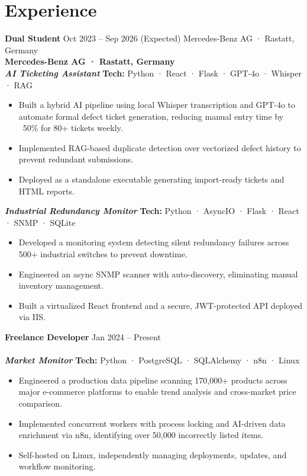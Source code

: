 \documentclass[10pt, a4paper]{article}
\newcommand{\entry}[3]{%
  \textbf{\large #1} \hfill \textcolor{subtle}{\small #2}%
  \def\temp{#3}\ifx\temp\empty\else\\[0.1em]\textbf{#3}\fi
}
\newcommand{\project}[2]{%
  \textbf{\textit{#1}} \hfill \textcolor{subtle}{\footnotesize \textbf{Tech:} #2}\vspace{0.1em}
}
\begin{document}
\begin{minipage}[t]{0.64\linewidth}


\section{Experience}

\entry{Dual Student}{Oct 2023 – Sep 2026 (Expected)}{Mercedes-Benz AG · Rastatt, Germany}\\[0.2em]
\project{AI Ticketing Assistant}{Python · React · Flask · GPT-4o · Whisper · RAG}
\begin{itemize}
  \item Built a hybrid AI pipeline using local Whisper transcription and GPT-4o to automate formal defect ticket generation, reducing manual entry time by ~50\% for 80+ tickets weekly.
  \item Implemented RAG-based duplicate detection over vectorized defect history to prevent redundant submissions.
  \item Deployed as a standalone executable generating import-ready tickets and HTML reports.
\end{itemize}

\vspace{0.4em}

\project{Industrial Redundancy Monitor}{Python · AsyncIO · Flask · React · SNMP · SQLite}
\begin{itemize}
  \item Developed a monitoring system detecting silent redundancy failures across 500+ industrial switches to prevent downtime.
  \item Engineered an async SNMP scanner with auto-discovery, eliminating manual inventory management.
  \item Built a virtualized React frontend and a secure, JWT-protected API deployed via IIS.
\end{itemize}

\vspace{0.4em}

\entry{Freelance Developer}{Jan 2024 – Present}{}\\[0.2em]
\project{Market Monitor}{Python · PostgreSQL · SQLAlchemy · n8n · Linux}
\begin{itemize}
  \item Engineered a production data pipeline scanning 170,000+ products across major e-commerce platforms to enable trend analysis and cross-market price comparison.
  \item Implemented concurrent workers with process locking and AI-driven data enrichment via n8n, identifying over 50,000 incorrectly listed items.
  \item Self-hosted on Linux, independently managing deployments, updates, and workflow monitoring.
\end{itemize}


\end{minipage}
\end{document}
